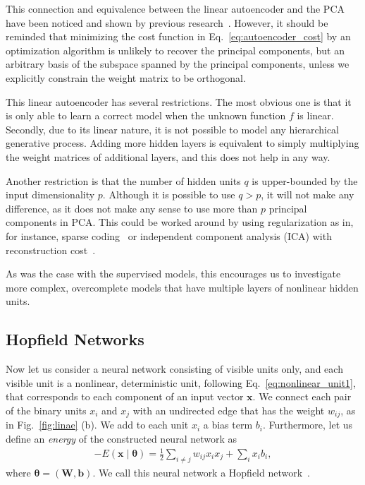 \documentclass{now}
\newcommand{\vect}[1]{\mathbf{#1}}
\newcommand{\vects}[1]{\boldsymbol{#1}}
\newcommand{\matr}[1]{\mathbf{#1}}
\newcommand{\vb}[0]{\vect{b}}
\newcommand{\vx}[0]{\vect{x}}
\newcommand{\mW}[0]{\matr{W}}
\newcommand{\TT}[0]{{\vects{\theta}}}
\begin{document}
This connection and equivalence between the linear autoencoder and the PCA have
been noticed and shown by previous research~\citep[see, for
instance,][]{Oja1982,Baldi1989}. However, it should be reminded that minimizing
the cost function in Eq.~\eqref{eq:autoencoder_cost} by an optimization
algorithm is unlikely to recover the principal components, but an arbitrary
basis of the subspace spanned by the principal components, unless we explicitly
constrain the weight matrix to be orthogonal.

This linear autoencoder has several restrictions.  The most obvious one is that
it is only able to learn a correct model when the unknown function $f$ is
linear.  Secondly, due to its linear nature, it is not possible to model any
hierarchical generative process. Adding more hidden layers is equivalent to
simply multiplying the weight matrices of additional layers, and this does not
help in any way.

Another restriction is that the number of hidden units $q$ is upper-bounded by
the input dimensionality $p$. Although it is possible to use $q > p$, it will
not make any difference, as it does not make any sense to use more than $p$
principal components in PCA.  This could be worked around by using
regularization as in, for instance, sparse coding~\citep{Olshausen1996} or
independent component analysis (ICA) with reconstruction cost~\citep{Le2011op}. 

As was the case with the supervised models, this encourages us to investigate
more complex, overcomplete models that have multiple layers of nonlinear hidden
units.


\subsection{Hopfield Networks}
\label{sec:hopfield_network}

Now let us consider a neural network consisting of visible units only, and each
visible unit is a nonlinear, deterministic unit, following
Eq.~\eqref{eq:nonlinear_unit1}, that corresponds to each component of an input
vector $\vx$. We connect each pair of the binary units $x_i$ and $x_j$ with an
undirected edge 
that has the weight $w_{ij}$, as in Fig.~\ref{fig:linae} (b).  We add to each
unit $x_i$ a bias term $b_i$.  Furthermore, let us define an \textit{energy} of
the constructed neural network as
\begin{align}
    \label{eq:hopfield_energy}
    -E(\vx \mid \TT) = \frac{1}{2} \sum_{i \neq j} w_{ij}
    x_i x_j + \sum_i x_i b_i,
\end{align}
where $\TT = \left( \mW, \vb \right)$.  We call this neural network a Hopfield
network~\citep{Hopfield1982}.
\end{document}
